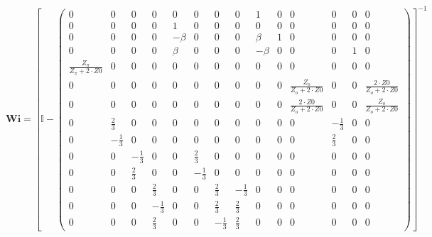 \[ \mathbf{Wi} =  \left[ \mathbb{I}  - \left(\begin{smallmatrix} 0 & 0
& 0 & 0 & 0 & 0 & 0 & 0 & 1 & 0 & 0 & 0 & 0 & 0 \\ 0 & 0 & 0 & 0 & 1 &
0 & 0 & 0 & 0 & 0 & 0 & 0 & 0 & 0 \\ 0 & 0 & 0 & 0 & -\beta & 0 & 0 &
0 & \beta & 1 & 0 & 0 & 0 & 0 \\ 0 & 0 & 0 & 0 & \beta & 0 & 0 & 0 &
-\beta & 0 & 0 & 0 & 1 & 0 \\ \frac{Z_{\pi}}{Z_{\pi}+2\cdot Z0} & 0 &
0 & 0 & 0 & 0 & 0 & 0 & 0 & 0 & 0 & 0 & 0 & 0 \\ 0 & 0 & 0 & 0 & 0 & 0
& 0 & 0 & 0 & 0 & \frac{Z_o}{Z_o+2\cdot Z0} & 0 & 0 & \frac{2\cdot
Z0}{Z_o+2\cdot Z0} \\ 0 & 0 & 0 & 0 & 0 & 0 & 0 & 0 & 0 & 0 &
\frac{2\cdot Z0}{Z_o+2\cdot Z0} & 0 & 0 & \frac{Z_o}{Z_o+2\cdot Z0} \\
0 & \frac{2}{3} & 0 & 0 & 0 & 0 & 0 & 0 & 0 & 0 & 0 & -\frac{1}{3} & 0
& 0 \\ 0 & -\frac{1}{3} & 0 & 0 & 0 & 0 & 0 & 0 & 0 & 0 & 0 &
\frac{2}{3} & 0 & 0 \\ 0 & 0 & -\frac{1}{3} & 0 & 0 & \frac{2}{3} & 0
& 0 & 0 & 0 & 0 & 0 & 0 & 0 \\ 0 & 0 & \frac{2}{3} & 0 & 0 &
-\frac{1}{3} & 0 & 0 & 0 & 0 & 0 & 0 & 0 & 0 \\ 0 & 0 & 0 &
\frac{2}{3} & 0 & 0 & \frac{2}{3} & -\frac{1}{3} & 0 & 0 & 0 & 0 & 0 &
0 \\ 0 & 0 & 0 & -\frac{1}{3} & 0 & 0 & \frac{2}{3} & \frac{2}{3} & 0
& 0 & 0 & 0 & 0 & 0 \\ 0 & 0 & 0 & \frac{2}{3} & 0 & 0 & -\frac{1}{3}
& \frac{2}{3} & 0 & 0 & 0 & 0 & 0 & 0 \end{smallmatrix}\right)
\right]^{-1}  \]
